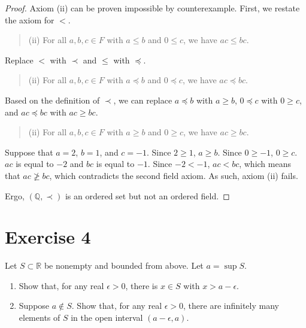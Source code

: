 \documentclass[11pt]{article}
\begin{document}
\begin{proof}
        Axiom (ii) can be proven impossible by counterexample.
        First, we restate the axiom for $<$. 
        \begin{quote}
            (ii) For all $a, b, c \in F$ with $a \leq b$ and $0 \leq c$, we have $ac \leq bc$.
        \end{quote}
        Replace $<$ with $\prec$ and $\leq$ with $\preceq$.
        \begin{quote}
            (ii) For all $a, b, c \in F$ with $a \preceq b$ and $0 \preceq c$, we have $ac \preceq bc$.
        \end{quote}
        Based on the definition of $\prec$, we can replace $a \preceq b$ with $a \geq b$, $0 \preceq c$ with $0 \geq c$, and $ac \preceq bc$ with $ac \geq bc$.
        \begin{quote}
            (ii) For all $a, b, c \in F$ with $a \geq b$ and $0 \geq c$, we have $ac \geq bc$.
        \end{quote}
        Suppose that $a = 2$, $b = 1$, and $c = -1$.
        Since $2 \geq 1$, $a \geq b$.
        Since $0 \geq -1$, $0 \geq c$.
        $ac$ is equal to $-2$ and $bc$ is equal to $-1$.
        Since $-2 < -1$, $ac < bc$, which means that $ac \ngeq bc$, which contradicts the second field axiom.
        As such, axiom (ii) fails.

        Ergo, $(\mathbb{Q}, \prec)$ is an ordered set but not an ordered field.
    \end{proof}
    
\pagebreak
\section{Exercise 4}
    Let $S \subset \mathbb{R}$ be nonempty and bounded from above. Let $a = \sup S$.
    \begin{enumerate}[label=(\alph*)]
        \item 
        Show that, for any real $\epsilon > 0$, there is $x \in S$ with $x > a - \epsilon$.

        \item 
        Suppose $a \notin S$. Show that, for any real $\epsilon > 0$, there are infinitely many elements of $S$ in the open interval $(a - \epsilon, a)$.
    \end{enumerate}
\end{document}
